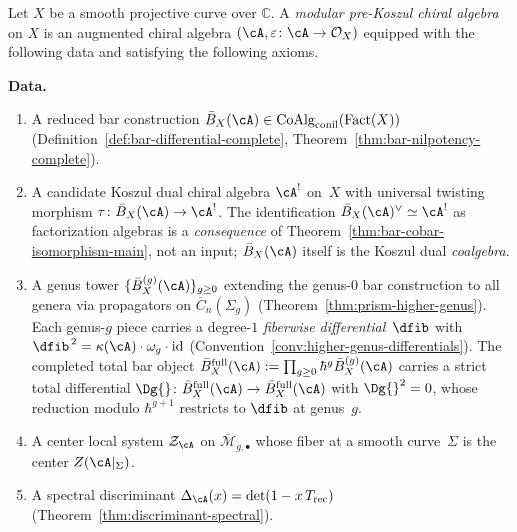 \begin{definition}\label{def:modular-koszul-chiral}
Let $X$ be a smooth projective curve over $\mathbb{C}$.
A \emph{modular pre-Koszul chiral algebra} on $X$ is an augmented chiral
algebra $(\cA, \varepsilon\colon \cA \to \mathcal{O}_X)$ equipped with
the following data and satisfying the following axioms.

\smallskip\noindent\textbf{Data.}
\begin{enumerate}[label=\textup{(D\arabic*)}]
\item\label{D:bar}
A reduced bar construction
$\bar{B}_X(\cA) \in \operatorname{CoAlg}_{\mathrm{conil}}(\operatorname{Fact}(X))$
(Definition~\ref{def:bar-differential-complete},
Theorem~\ref{thm:bar-nilpotency-complete}).

\item\label{D:dual}
A candidate Koszul dual chiral algebra $\cA^!$ on~$X$ with
universal twisting morphism
$\tau\colon \bar{B}_X(\cA) \to \cA^!$.  The identification
$\bar{B}_X(\cA)^\vee \simeq \cA^!$ as factorization algebras is a
\emph{consequence} of Theorem~\ref{thm:bar-cobar-isomorphism-main},
not an input; $\bar{B}_X(\cA)$ itself is the Koszul dual \emph{coalgebra}.

\item\label{D:genus-tower}
A genus tower $\{\bar{B}^{(g)}_X(\cA)\}_{g \geq 0}$ extending the
genus-$0$ bar construction to all genera via propagators on
$\overline{C}_n(\Sigma_g)$
(Theorem~\ref{thm:prism-higher-genus}).
Each genus-$g$ piece carries a degree-$1$ \emph{fiberwise
differential}~$\dfib$ with
$\dfib^{\,2} = \kappa(\cA) \cdot \omega_g \cdot \operatorname{id}$
(Convention~\ref{conv:higher-genus-differentials}).
The completed total bar object
$\bar{B}^{\mathrm{full}}_X(\cA) :=
\prod_{g \geq 0} \hbar^g \bar{B}^{(g)}_X(\cA)$
carries a strict total differential $\Dg{} \colon
\bar{B}^{\mathrm{full}}_X(\cA) \to \bar{B}^{\mathrm{full}}_X(\cA)$
with $\Dg{}^2 = 0$, whose reduction modulo $\hbar^{g+1}$ restricts
to $\dfib$ at genus~$g$.

\item\label{D:center-dg}
A center local system $\mathcal{Z}_{\cA}$ on
$\overline{\mathcal{M}}_{g,\bullet}$ whose fiber at a smooth
curve~$\Sigma$ is the center $Z(\cA|_\Sigma)$.

\item\label{D:discriminant-dg}
A spectral discriminant
$\Delta_{\cA}(x) = \det(1 - x\, T_{\mathrm{rec}})$
(Theorem~\ref{thm:discriminant-spectral}).


\end{enumerate}
\end{definition}
